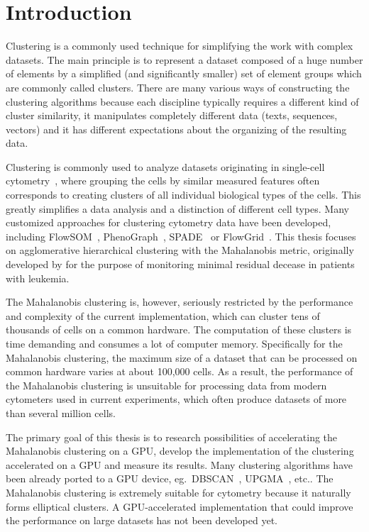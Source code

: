 \chapter*{Introduction}

Clustering is a commonly used technique for simplifying the work with complex data\-sets.
The main principle is to represent a dataset composed of a huge number of elements by a simplified (and significantly smaller) set of element groups which are commonly called clusters.
There are many various ways of constructing the clustering algorithms because each discipline typically requires a different kind of cluster similarity, it manipulates completely different data (texts, sequences, vectors) and it has different expectations about the organizing of the resulting data.

Clustering is commonly used to analyze datasets originating in single-cell cytometry~\cite{shapiro2005practical}, where grouping the cells by similar measured features often corresponds to creating clusters of all individual biological types of the cells. This greatly simplifies a data analysis and a distinction of different cell types. Many customized approaches for clustering cytometry data have been developed, including FlowSOM~\cite{van2015flowsom}, PhenoGraph~\cite{levine2015data}, SPADE~\cite{qiu2011extracting} or FlowGrid~\cite{ye2019ultrafast}. This thesis focuses on agglomerative hierarchical clustering with the Mahalanobis metric, originally developed by \citet{fivser2012detection} for the purpose of monitoring minimal residual decease in patients with leukemia. 

The Mahalanobis clustering is, however, seriously restricted by the performance and complexity of the current implementation, which can cluster tens of thousands of cells on a common hardware.
The computation of these clusters is time demanding and consumes a lot of computer memory. Spe\-cifically for the Mahalanobis clustering, the maximum size of a dataset that can be processed on common hardware varies at about 100,000 cells. As a result, the performance of the Mahalanobis clustering is unsuitable for processing data from modern cytometers used in current experiments, which often produce datasets of more than several million cells.

The primary goal of this thesis is to research possibilities of accelerating the Mahalanobis clustering on a GPU, develop the implementation of the clustering accelerated on a GPU and measure its results. Many clustering algorithms have been already ported to a GPU device, eg.~DBSCAN~\cite{andrade2013g}, UPGMA~\cite{hua2017mgupgma}, etc.. The Mahalanobis clustering is extremely suitable for cytometry because it naturally forms elliptical clusters. A GPU-accelerated implementation that could improve the performance on large datasets has not been developed yet.

